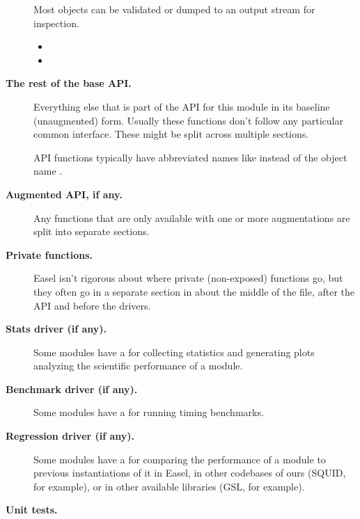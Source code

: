 \begin{description}
  Most objects can be validated or dumped to an output stream
  for inspection.

  \begin{itemize}
      \item {}
      \item {}
  \end{itemize}

\item[\textbf{The rest of the base API.}]

  Everything else that is part of the API for this module in its
  baseline (unaugmented) form. Usually these functions don't follow
  any particular common interface.  These might be split across
  multiple sections.

  API functions typically have abbreviated names like
   instead of the object name
  .

\item[\textbf{Augmented API, if any.}]

  Any functions that are only available with one or more augmentations
  are split into separate sections. 

\item[\textbf{Private functions.}]

  Easel isn't rigorous about where private (non-exposed) functions go,
  but they often go in a separate section in about the middle of the
   file, after the API and before the drivers.

\item[\textbf{Stats driver (if any).}]

  Some modules have a  for collecting statistics and
  generating plots analyzing the scientific performance of a module.

\item[\textbf{Benchmark driver (if any).}]

  Some modules have a  for running timing benchmarks.

\item[\textbf{Regression driver (if any).}]

  Some modules have a  for comparing the performance of
  a module to previous instantiations of it in Easel, in other
  codebases of ours (SQUID, for example), or in other available
  libraries (GSL, for example).

\item [\textbf{Unit tests.}]
 

\end{description}
